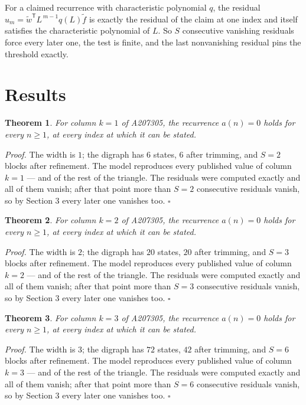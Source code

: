 \documentclass[11pt]{article}
\newtheorem{theorem}{Theorem}
\theoremstyle{definition}
\begin{document}
For a claimed recurrence with characteristic polynomial $q$, the residual $u_m = \tilde w^{\mathsf T}L^{\,m-1}q(L)\tilde f$ is exactly the residual of the claim at one index and itself satisfies the characteristic polynomial of $L$. So $S$ consecutive vanishing residuals force every later one, the test is finite, and the last nonvanishing residual pins the threshold exactly.

\section{Results}

\begin{theorem} For column $k = 1$ of A207305, the recurrence $a(n) = 0$ holds for every $n \ge 1$, at every index at which it can be stated.\end{theorem}

{\itshape Proof.} The width is $1$; the digraph has $6$ states, $6$ after trimming, and $S = 2$ blocks after refinement. The model reproduces every published value of column $k = 1$ --- and of the rest of the triangle. The residuals were computed exactly and all of them vanish; after that point more than $S = 2$ consecutive residuals vanish, so by Section 3 every later one vanishes too. $\square$

\begin{theorem} For column $k = 2$ of A207305, the recurrence $a(n) = 0$ holds for every $n \ge 1$, at every index at which it can be stated.\end{theorem}

{\itshape Proof.} The width is $2$; the digraph has $20$ states, $20$ after trimming, and $S = 3$ blocks after refinement. The model reproduces every published value of column $k = 2$ --- and of the rest of the triangle. The residuals were computed exactly and all of them vanish; after that point more than $S = 3$ consecutive residuals vanish, so by Section 3 every later one vanishes too. $\square$

\begin{theorem} For column $k = 3$ of A207305, the recurrence $a(n) = 0$ holds for every $n \ge 1$, at every index at which it can be stated.\end{theorem}

{\itshape Proof.} The width is $3$; the digraph has $72$ states, $42$ after trimming, and $S = 6$ blocks after refinement. The model reproduces every published value of column $k = 3$ --- and of the rest of the triangle. The residuals were computed exactly and all of them vanish; after that point more than $S = 6$ consecutive residuals vanish, so by Section 3 every later one vanishes too. $\square$
\end{document}
